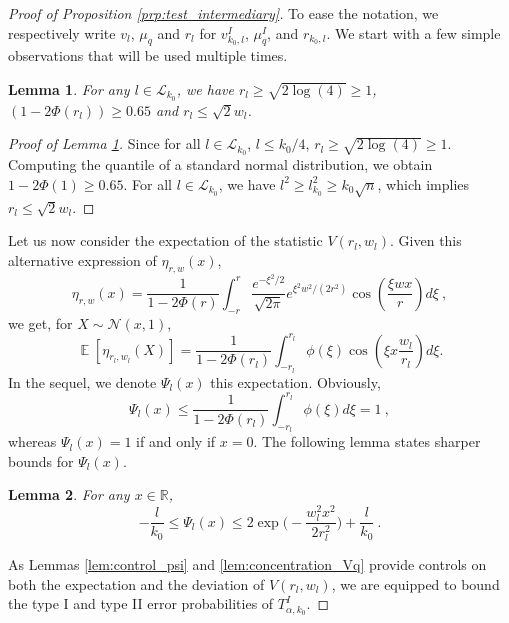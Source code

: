 \documentclass[twoside,11pt]{article}
\newtheorem{lem}{Lemma}
\def\beq{\begin{equation}}
\def\eeq{\end{equation}}
\def\cL{\mathcal{L}}
\def\cN{\mathcal{N}}
\newcommand{\E}{\operatorname{\mathbb{E}}}
\newcommand{\<}{\langle}
\renewcommand{\>}{\rangle}
\begin{document}
 
 
 
\begin{proof}[Proof of Proposition \ref{prp:test_intermediary}]

To ease the notation, we respectively write $v_{l}$, $\mu_q$ and $r_{l}$ for $v_{k_0,l}^I$, $\mu_q^I$, and $r_{k_0,l}$.
We start with a few simple observations that will be used multiple times.

\begin{lem}\label{lem:aqr_q}
 For any $l \in \cL_{k_0}$, we have $r_{l}\geq \sqrt{2\log(4)}\geq  1$, $(1-2\Phi(r_{l}))\geq 0.65$ and  $r_{l}\leq \sqrt{2}w_l$.
\end{lem}

\begin{proof}[Proof of Lemma \ref{lem:aqr_q}]
Since for all $l\in \cL_{k_0}$, $l\leq k_0/4$, $r_{l}\geq \sqrt{2\log(4)}\geq 1$. Computing the quantile of a standard normal distribution, we obtain $1-2\Phi(1)\geq 0.65$. For all $l\in \cL_{k_0}$, we have $l^2\geq l_{k_0}^2\geq k_0\sqrt{n}$, which implies $r_{l}\leq \sqrt{2}w_l$.
\end{proof}





 
 Let us  now consider the expectation of the statistic $V(r_{l},w_l)$. 
 Given this alternative expression of $\eta_{r,w}(x)$,
\beq\label{eq:def_eta_alt}
\eta_{r,w}(x)=  \frac{1}{1-2\Phi(r)}\int_{-r}^{r} \frac{e^{-\xi^2/2}}{\sqrt{2\pi}} e^{\xi^2 w^2/(2r^2) }\cos(\frac{\xi w x}{r})d\xi\ ,
\eeq
we get, for $X\sim \cN(x,1)$, 
 \beq \label{eq:definition_psiq}
  \E[\eta_{r_{l},w_l} (X)]= \frac{1}{1-2\Phi(r_{l})}\int_{-r_{l}}^{r_{l}} \phi(\xi)\cos(\xi x \frac{w_l}{r_{l}} )d\xi.
 \eeq
 In the sequel, we denote $\Psi_l(x)$ this expectation. Obviously, 
 \[
  \Psi_l(x)\leq  \frac{1}{1-2\Phi(r_{l})}\int_{-r_{l}}^{r_{l}} \phi(\xi)d\xi = 1\ ,
 \]
 whereas $\Psi_l(x)=1$ if and only if $x=0$. The following lemma states sharper bounds for $\Psi_l(x)$. 
\begin{lem}\label{lem:control_psi}
 For any $x\in \mathbb{R}$, 
 \beq\label{eq:lower_V_theta}
  -\frac{l}{k_0} \leq \Psi_l(x)  \leq  2\exp\big(- \frac{w_l^2x^2}{2r_{l}^2}\big) + \frac{l}{k_0}\ .
 \eeq
\end{lem}
As Lemmas \eqref{lem:control_psi} and \ref{lem:concentration_Vq} provide controls  on both the expectation and the deviation of $V(r_{l},w_l)$, we are equipped to bound the type I and type II error probabilities of $T_{\alpha,k_0}^I$.


\end{proof}
\end{document}
